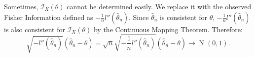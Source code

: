 \documentclass{huhtakm-template-book-v2}
\DeclareMathOperator{\N}{N}
\begin{document}
    \begin{rem}
        \label{Chapter 2 (Remark) Cases when Fisher Information cannot be determined easily}
        Sometimes, $\mathcal{I}_{X}(\theta)$ cannot be determined easily. We replace it with the observed Fisher Information defined as $-\frac{1}{n}l''(\hat{\theta}_{n})$. Since $\hat{\theta}_{n}$ is consistent for $\theta$, $-\frac{1}{n}l''(\hat{\theta}_{n})$ is also consistent for $\mathcal{I}_{X}(\theta)$ by the Continuous Mapping Theorem. Therefore:
        \begin{equation*}
            \sqrt{-l''(\hat{\theta}_{n})}(\hat{\theta}_{n} - \theta) = \sqrt{n}\sqrt{-\frac{1}{n}l''(\hat{\theta}_{n})}(\hat{\theta}_{n} - \theta) \to \N(0, 1).
        \end{equation*}
    \end{rem}
    \newpage
    
\end{document}
